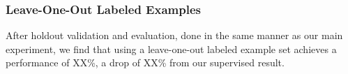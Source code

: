 \subsubsection{Leave-One-Out Labeled Examples}

After holdout validation and evaluation, done in the same manner as our main
experiment, we find that using a leave-one-out labeled example set achieves a
performance of XX\%, a drop of XX\% from our supervised result.
